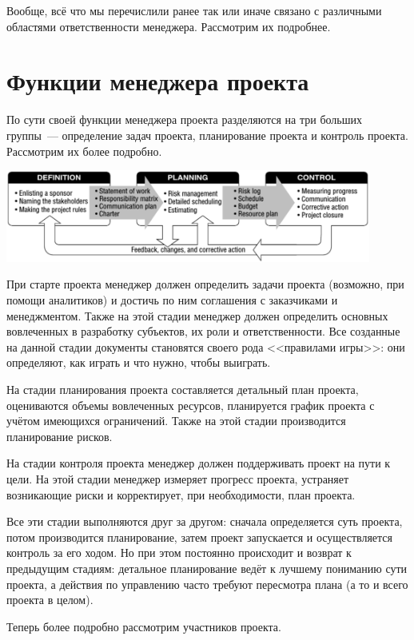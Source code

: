 \documentclass{../../text-style}
\begin{document}
Вообще, всё что мы перечислили ранее так или иначе связано с различными областями ответственности менеджера. Рассмотрим их подробнее.

\section{Функции менеджера проекта}

По сути своей функции менеджера проекта разделяются на три больших группы~--- определение задач проекта, планирование проекта и контроль проекта. Рассмотрим их более подробно.

\begin{center}
    \includegraphics[width=0.9\textwidth]{projectManagerFunctions.png}
\end{center}

При старте проекта менеджер должен определить задачи проекта (возможно, при помощи аналитиков) и достичь по ним соглашения с заказчиками и менеджментом. Также на этой стадии менеджер должен определить основных вовлеченных в разработку субъектов, их роли и ответственности. Все созданные на данной стадии документы становятся своего рода <<правилами игры>>: они определяют, как играть и что нужно, чтобы выиграть.

На стадии планирования проекта составляется детальный план проекта, оцениваются объемы вовлеченных ресурсов, планируется график проекта с учётом имеющихся ограничений. Также на этой стадии производится планирование рисков.

На стадии контроля проекта менеджер должен поддерживать проект на пути к цели. На этой стадии менеджер измеряет прогресс проекта, устраняет возникающие риски и корректирует, при необходимости, план проекта.

Все эти стадии выполняются друг за другом: сначала определяется суть проекта, потом производится планирование, затем проект запускается и осуществляется контроль за его ходом. Но при этом постоянно происходит и возврат к предыдущим стадиям: детальное планирование ведёт к лучшему пониманию сути проекта, а действия по управлению часто требуют пересмотра плана (а то и всего проекта в целом).

Теперь более подробно рассмотрим участников проекта.
\end{document}
